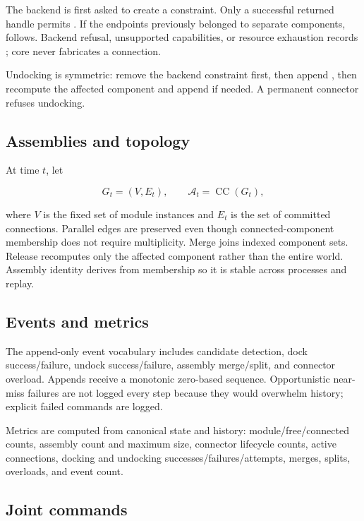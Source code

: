 The backend is first asked to create a constraint. Only a successful returned handle
permits . If the endpoints previously belonged to separate
components,  follows. Backend refusal, unsupported capabilities,
or resource exhaustion records ; core never fabricates a connection.

Undocking is symmetric: remove the backend constraint first, then append
, then recompute the affected component and append
 if needed. A permanent connector refuses undocking.

\subsection{Assemblies and topology}

At time $t$, let

\begin{equation}
G_t=(V,E_t), \qquad \mathcal A_t=\operatorname{CC}(G_t),
\label{eq:assemblies}
\end{equation}

where $V$ is the fixed set of module instances and $E_t$ is the set of committed
connections. Parallel edges are preserved even though connected-component membership
does not require multiplicity. Merge joins indexed component sets. Release recomputes
only the affected component rather than the entire world. Assembly identity derives
from membership so it is stable across processes and replay.

\subsection{Events and metrics}

The append-only event vocabulary includes candidate detection, dock success/failure,
undock success/failure, assembly merge/split, and connector overload. Appends receive a
monotonic zero-based sequence. Opportunistic near-miss failures are not logged every
step because they would overwhelm history; explicit failed commands are logged.

Metrics are computed from canonical state and history: module/free/connected counts,
assembly count and maximum size, connector lifecycle counts, active connections,
docking and undocking successes/failures/attempts, merges, splits, overloads, and event
count.

\subsection{Joint commands}

